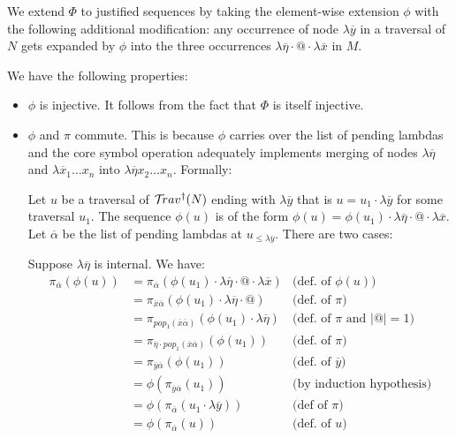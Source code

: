 \documentclass{article}
\theoremstyle{plain}
\theoremstyle{definition}
\theoremstyle{remark}
\def\coresymbol{\pi} %
\begin{document}
\begin{description}
    We extend $\Phi$ to justified sequences by taking the element-wise extension $\phi$ with the following additional modification: any occurrence of node $\lambda\overline{y}$ in a traversal of $N$ gets expanded by $\phi$ into the three occurrences $\lambda\overline\eta \cdot @ \cdot \lambda\overline{x}$ in $M$.

    We have the following properties:
    \begin{itemize}
    \item $\phi$ is injective. It follows from the fact that $\Phi$ is itself injective.

    \item $\phi$ and $\coresymbol$ commute. This is because $\phi$ carries over the list of pending lambdas and the core symbol operation adequately implements merging of nodes $\lambda\overline\eta$ and
    $\lambda\overline x_1 \ldots x_n$ into
    $\lambda\overline\eta x_2 \ldots x_n$. Formally:

    Let $u$ be a traversal of $\mathcal{T}\!rav^\dagger(N)$
    ending with $\lambda\overline{y}$ that is
    $u = u_1 \cdot \lambda\overline{y} $ for some traversal $u_1$.
    The sequence $\phi(u)$ is of the form
    $\phi(u) = \phi(u_1) \cdot \lambda\overline{\eta} \cdot @ \cdot \lambda\overline{x}$. Let $\overline\alpha$ be the list of pending lambdas at $u_{\leq \lambda\overline{y}}$. There are two cases:

    Suppose $\lambda\overline\eta$ is internal. We have:
    \begin{align*}
        \coresymbol_{\overline\alpha}(\phi(u))
        &=  \coresymbol_{\overline\alpha}(\phi(u_1) \cdot \lambda\overline{\eta} \cdot @ \cdot \lambda\overline{x})
            & \mbox{(def.~of $\phi(u)$)}
        \\
        &=  \coresymbol_{\overline{x}\overline\alpha}(\phi(u_1) \cdot
        \lambda\overline\eta \cdot @)
            & \mbox{(def.~of $\coresymbol$)}
        \\
        &=  \coresymbol_{pop_1(\overline{x}\overline\alpha)}(\phi(u_1) \cdot
        \lambda\overline{\eta})
            & \mbox{(def.~of $\coresymbol$ and $|@|=1$)}
        \\
        &=  \coresymbol_{\overline\eta \cdot pop_1(\overline{x}\overline\alpha)}(\phi(u_1))
            & \mbox{(def.~of $\coresymbol$)}
        \\
        &=  \coresymbol_{\overline{y}\overline\alpha}(\phi(u_1))
            & \mbox{(def.~of $\overline{y}$)}
        \\
        &=  \phi(\coresymbol_{\overline{y}\overline\alpha}(u_1))
            & \mbox{(by induction hypothesis)}
        \\
        &= \phi(\coresymbol_{\overline\alpha}(u_1 \cdot \lambda\overline{y})) & \mbox{(def of $\coresymbol$)} \\
        &=  \phi(\coresymbol_{\overline\alpha}(u))
            & \mbox{(def.~of $u$)}
    \end{align*}


\end{itemize}
\end{description}
\end{document}
